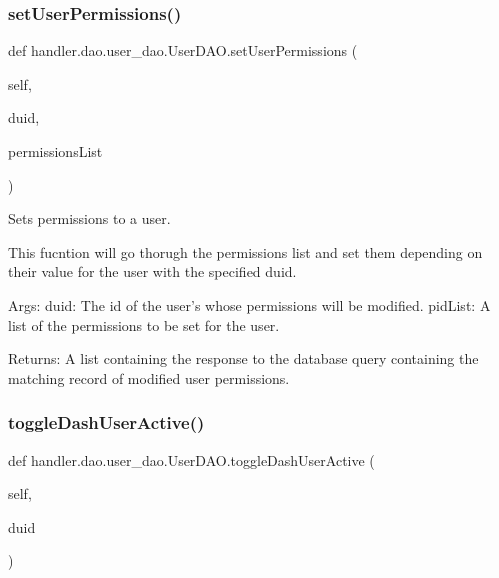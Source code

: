 \subsubsection{\texorpdfstring{set\+User\+Permissions()}{setUserPermissions()}}
{\footnotesize\ttfamily def handler.\+dao.\+user\+\_\+dao.\+User\+D\+A\+O.\+set\+User\+Permissions (\begin{DoxyParamCaption}\item[{}]{self,  }\item[{}]{duid,  }\item[{}]{permissions\+List }\end{DoxyParamCaption})}

\begin{DoxyVerb}Sets permissions to a user.

This fucntion will go thorugh the permissions list and set them depending on their value for
the user with the specified duid.

Args:
    duid: The id of the user's whose permissions will be modified.
    pidList: A list of the permissions to be set for the user.

Returns:
    A list containing the response to the database query containing 
    the matching record of modified user permissions.
\end{DoxyVerb}
 \mbox{\label{classhandler_1_1dao_1_1user__dao_1_1_user_d_a_o_a7d3f0c6b17a15ea1bc3eb883d03ea0e8}} 
\subsubsection{\texorpdfstring{toggle\+Dash\+User\+Active()}{toggleDashUserActive()}}
{\footnotesize\ttfamily def handler.\+dao.\+user\+\_\+dao.\+User\+D\+A\+O.\+toggle\+Dash\+User\+Active (\begin{DoxyParamCaption}\item[{}]{self,  }\item[{}]{duid }\end{DoxyParamCaption})}

